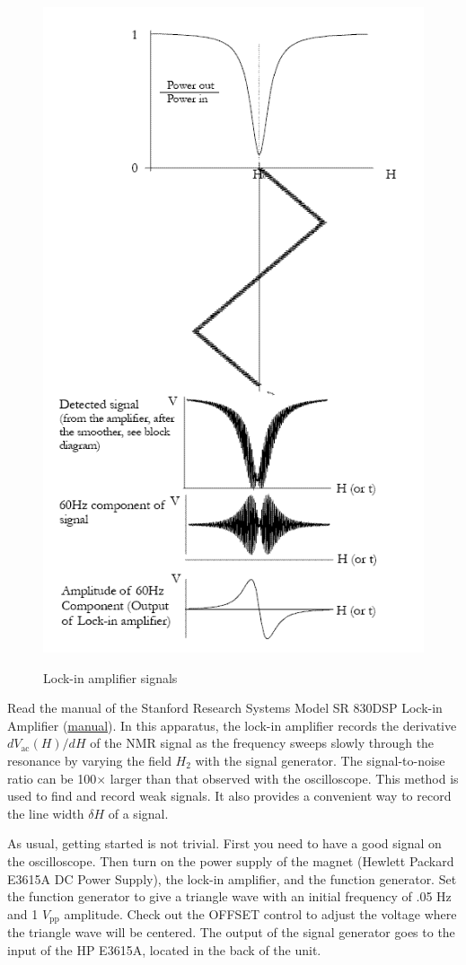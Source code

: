 \documentclass{../lab}
\begin{document}
\begin{figure}[h]
    \centering
    \href{http://experimentationlab.berkeley.edu/sites/default/files/lockinampsignals.png}{\includegraphics[width=0.5\linewidth]{images/lockinampsignals.png}}
    \caption{Lock-in amplifier signals}
    \label{fig:LockInAmplifierSignals}
\end{figure}

Read the manual of the Stanford Research Systems Model SR 830DSP Lock-in Amplifier (\href{http://physics111.lib.berkeley.edu/Physics111/Equipment_Manuals/SRS/SR830m.pdf}{manual}). In this apparatus, the lock-in amplifier records the derivative $dV_\text{ac}(H)/dH$ of the NMR signal as the frequency sweeps slowly through the resonance by varying the field $H_2$ with the signal generator. The signal-to-noise ratio can be 100$\times$ larger than that observed with the oscilloscope. This method is used to find and record weak signals. It also provides a convenient way to record the line width $\delta H$ of a signal.

As usual, getting started is not trivial. First you need to have a good signal on the oscilloscope. Then turn on the power supply of the magnet (Hewlett Packard E3615A DC Power Supply), the lock-in amplifier, and the function generator. Set the function generator to give a triangle wave with an initial frequency of .05 Hz and 1 $V_\text{pp}$ amplitude. Check out the OFFSET control to adjust the voltage where the triangle wave will be centered. The output of the signal generator goes to the input of the HP E3615A, located in the back of the unit.
\end{document}
